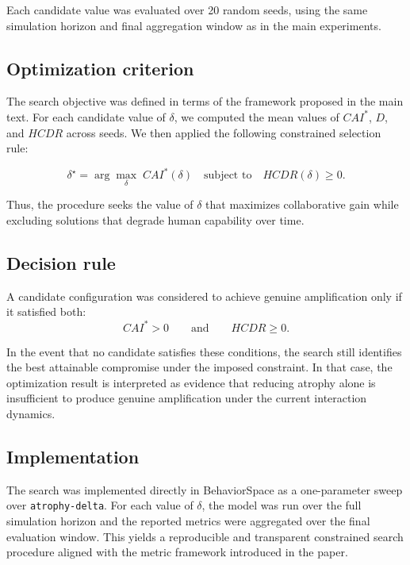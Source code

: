 \documentclass[11pt,a4paper]{article}
\begin{document}
Each candidate value was evaluated over 20 random seeds, using the same simulation horizon and final aggregation window as in the main experiments.

\subsection{Optimization criterion}

The search objective was defined in terms of the framework proposed in the main text. For each candidate value of $\delta$, we computed the mean values of $CAI^*$, $D$, and $HCDR$ across seeds. We then applied the following constrained selection rule:

\[
\delta^\star
=
\arg\max_{\delta}
\; CAI^*(\delta)
\quad
\text{subject to}
\quad
HCDR(\delta) \ge 0.
\]

Thus, the procedure seeks the value of $\delta$ that maximizes collaborative gain while excluding solutions that degrade human capability over time.

\subsection{Decision rule}

A candidate configuration was considered to achieve genuine amplification only if it satisfied both:
\[
CAI^* > 0
\qquad \text{and} \qquad
HCDR \ge 0.
\]

In the event that no candidate satisfies these conditions, the search still identifies the best attainable compromise under the imposed constraint. In that case, the optimization result is interpreted as evidence that reducing atrophy alone is insufficient to produce genuine amplification under the current interaction dynamics.

\subsection{Implementation}

The search was implemented directly in BehaviorSpace as a one-parameter sweep over \texttt{atrophy-delta}. For each value of $\delta$, the model was run over the full simulation horizon and the reported metrics were aggregated over the final evaluation window. This yields a reproducible and transparent constrained search procedure aligned with the metric framework introduced in the paper.
\end{document}
